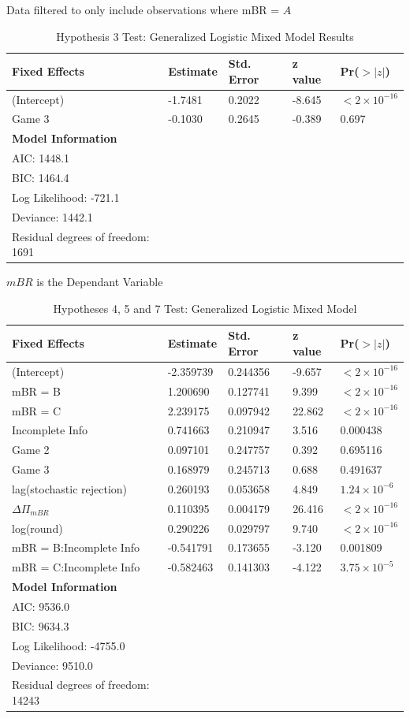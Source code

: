 \begin{table}[htbp]
\centering
\caption{Hypothesis 3 Test: Generalized Logistic Mixed Model Results}
Data filtered to only include observations where mBR = $A$
\label{tab:regression4}
\begin{tabular}{lllll}
\hline
\textbf{Fixed Effects} & \textbf{Estimate} & \textbf{Std. Error} & \textbf{z value} & \textbf{Pr($>|z|$)} \\
\hline
(Intercept) & -1.7481 & 0.2022 & -8.645 & $<2 \times 10^{-16}$ \\
Game 3 & -0.1030 & 0.2645 & -0.389 & 0.697 \\
\hline
\multicolumn{5}{l}{\textbf{Model Information}} \\
\hline
AIC: 1448.1 \\
BIC: 1464.4 \\
Log Likelihood: -721.1 \\
Deviance: 1442.1 \\
Residual degrees of freedom: 1691 \\
\hline
\end{tabular}
\end{table}

\begin{table}[h]
\centering
\caption{Hypotheses 4, 5 and 7 Test: Generalized Logistic Mixed Model}
$mBR$ is the Dependant Variable
\label{tab:glm46}
\begin{tabular}{lllll}
\hline
\textbf{Fixed Effects} & \textbf{Estimate} & \textbf{Std. Error} & \textbf{z value} & \textbf{Pr($>|z|$)} \\
\hline
(Intercept) & -2.359739 & 0.244356 & -9.657 & $< 2 \times 10^{-16}$ \\
mBR = B & 1.200690 & 0.127741 & 9.399 & $< 2 \times 10^{-16}$ \\
mBR = C & 2.239175 & 0.097942 & 22.862 & $< 2 \times 10^{-16}$ \\
Incomplete Info & 0.741663 & 0.210947 & 3.516 & 0.000438 \\
Game 2 & 0.097101 & 0.247757 & 0.392 & 0.695116 \\
Game 3 & 0.168979 & 0.245713 & 0.688 & 0.491637 \\
lag(stochastic rejection) & 0.260193 & 0.053658 & 4.849 & $1.24 \times 10^{-6}$ \\
$\Delta\Pi_{mBR}$ & 0.110395 & 0.004179 & 26.416 & $< 2 \times 10^{-16}$ \\
log(round) & 0.290226 & 0.029797 & 9.740 & $< 2 \times 10^{-16}$ \\
mBR = B:Incomplete Info & -0.541791 & 0.173655 & -3.120 & 0.001809 \\
mBR = C:Incomplete Info & -0.582463 & 0.141303 & -4.122 & $3.75 \times 10^{-5}$ \\
\hline
\multicolumn{5}{l}{\textbf{Model Information}} \\
\hline
AIC: 9536.0 \\
BIC: 9634.3 \\
Log Likelihood: -4755.0 \\
Deviance: 9510.0 \\
Residual degrees of freedom: 14243 \\
\hline
\end{tabular}
\end{table}

